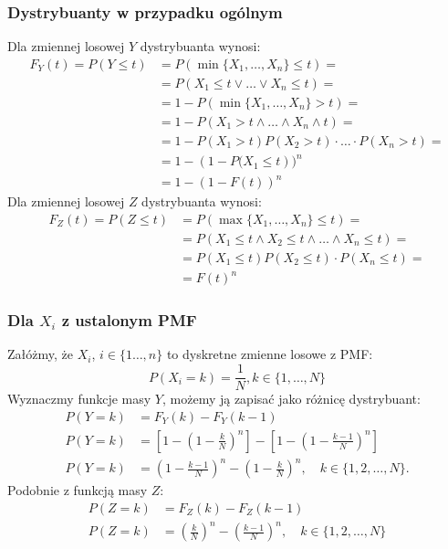 \documentclass{article}
\begin{document}
\subsubsection*{Dystrybuanty w przypadku ogólnym}

Dla zmiennej losowej $Y$ dystrybuanta wynosi:
\setcounter{equation}{0}
\begin{align}
    F_Y(t) = P(Y\leq t) &= P(\min\{X_1,\dots, X_n\} \leq t) =\\
    &= P(X_1 \leq t \lor \dots \lor X_n \leq t) =\\
    &= 1 - P(\min\{X_1,\dots,X_n\} > t) =\\
    &= 1 - P(X_1 > t\land \dots \land X_n \land t) =\\
    &= 1 - P(X_1>t)P(X_2>t)\cdot \dots \cdot P(X_n>t)=\\
    &= 1 - \left(1-P(X_1\leq t\right))^n\\
    &= 1 - (1-F(t))^n
\end{align}
Dla zmiennej losowej $Z$ dystrybuanta wynosi:
\begin{align}
    F_Z(t) = P(Z\leq t) &= P(\max\{X_1,\dots, X_n\} \leq t) =\\
    &=P(X_1 \leq t \land X_2 \leq t \land \dots \land X_n \leq t) =\\
    &=P(X_1\leq t)P(X_2\leq t)\cdot P(X_n\leq t) =\\
    &=F(t)^n
\end{align}

\subsubsection*{Dla $X_i$ z ustalonym PMF}

Załóżmy, że $X_i$, $i\in\{1\dots, n\}$ to dyskretne zmienne losowe z PMF:
\[
    P(X_i = k) = \frac{1}{N}, k\in\{1,\dots, N\}
\]
Wyznaczmy funkcje masy $Y$, możemy ją zapisać jako różnicę dystrybuant:
\begin{align}
    P(Y = k) &= F_Y(k) - F_Y(k-1)\\
    P(Y = k) &= \left[1 - \left(1 - \frac{k}{N}\right)^n\right] - \left[1 - \left(1 - \frac{k-1}{N}\right)^n\right]\\
    P(Y = k) &= \left(1 - \frac{k-1}{N}\right)^n - \left(1 - \frac{k}{N}\right)^n, \quad k \in \{1, 2, \dots, N\}.
\end{align}
Podobnie z funkcją masy $Z$:
\begin{align}
    P(Z = k) &= F_Z(k) - F_Z(k-1)\\
    P(Z = k) &= \left(\frac{k}{N}\right)^n - \left(\frac{k-1}{N}\right)^n, \quad k \in \{1, 2, \dots, N\}
\end{align}
\end{document}

